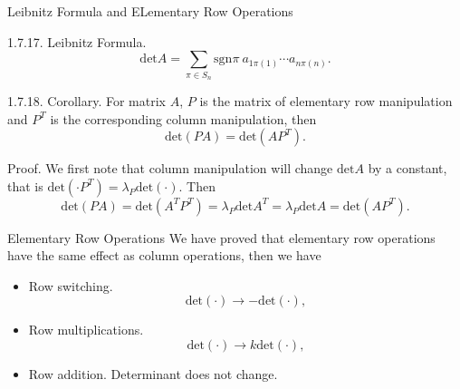 \documentclass[hyperref={pdfpagelabels=true}]{beamer}
\newcommand{\<}{\langle}
\renewcommand{\>}{\rangle}
\newenvironment{shrinkeq}[1]%
{ \bgroup
  \addtolength\abovedisplayshortskip{#1}
  \addtolength\abovedisplayskip{#1}
  \addtolength\belowdisplayshortskip{#1}
  \addtolength\belowdisplayskip{#1}}
{\egroup\ignorespacesafterend}
\begin{document}
    \begin{frame}{Leibnitz Formula and ELementary Row Operations}
        \begin{block}{1.7.17. Leibnitz Formula.}
            \begin{shrinkeq}{-0.3em}
            \[\text{det}A = \sum_{\pi \in S_{n}}\text{sgn}\pi\ a_{1\pi(1)} \cdots a_{n\pi(n)}.\]
            \end{shrinkeq}
        \end{block}
        \begin{block}{1.7.18. Corollary.}
            For matrix $A$, $P$ is the matrix of elementary row manipulation and $P^{T}$ is the corresponding column manipulation, then
            \begin{shrinkeq}{-0.3em} 
            \[\text{det}(PA) = \text{det}(AP^{T}).\]
            \end{shrinkeq}
        \end{block}
        \begin{block}{Proof.}
            We first note that column manipulation will change $\text{det}A$ by a constant, that is $\text{det}(\cdot P^{T}) = \lambda_{P}\text{det}(\cdot)$. Then
            \begin{shrinkeq}{-0.3em}
            \[\text{det}(PA) = \text{det}(A^{T}P^{T}) = \lambda_{P}\text{det}A^{T} = \lambda_{P}\text{det}A = \text{det}(AP^{T}).\]
            \end{shrinkeq}
        \end{block}
    \end{frame}
    \begin{frame}{Elementary Row Operations}
        We have proved that elementary row operations have the same effect as column operations, then we have 
        \begin{itemize}
            \item Row switching.
            \[\text{det}(\cdot) \rightarrow -\text{det}(\cdot),\]
            \item Row multiplications.
            \[\text{det}(\cdot) \rightarrow k\text{det}(\cdot),\]
            \item Row addition. Determinant does not change.
        \end{itemize}
    \end{frame}
\end{document}
